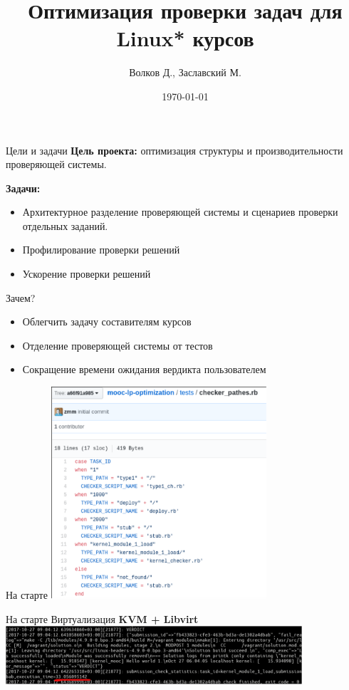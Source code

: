 \documentclass{beamer}
\begin{document}
\title{Оптимизация проверки задач для Linux* курсов}  
\author{Волков Д., Заславский М.}
\date{\today} 
\frame{\titlepage} 

\begin{frame}{Цели и задачи}
	\textbf{Цель проекта:} оптимизация структуры и производительности проверяющей системы.

	\textbf{Задачи:}
	\begin{itemize}
		\item Архитектурное разделение проверяющей системы и сценариев проверки отдельных заданий.
		\item Профилирование проверки решений
		\item Ускорение проверки решений 
	\end{itemize}
\end{frame}

\begin{frame}{Зачем?}
	\begin{itemize}
		\item Облегчить задачу составителям курсов
		\item Отделение проверяющей системы от тестов
		\item Сокращение времени ожидания вердикта пользователем
	\end{itemize}
\end{frame}

\begin{frame}{На старте}
	\includegraphics[width=80mm]{./patchesrb.pdf}
\end{frame}

\begin{frame}{На старте}
	Виртуализация \textbf{KVM + Libvirt}
	\includegraphics[width=110mm]{./length_start.pdf}
\end{frame}
\end{document}
